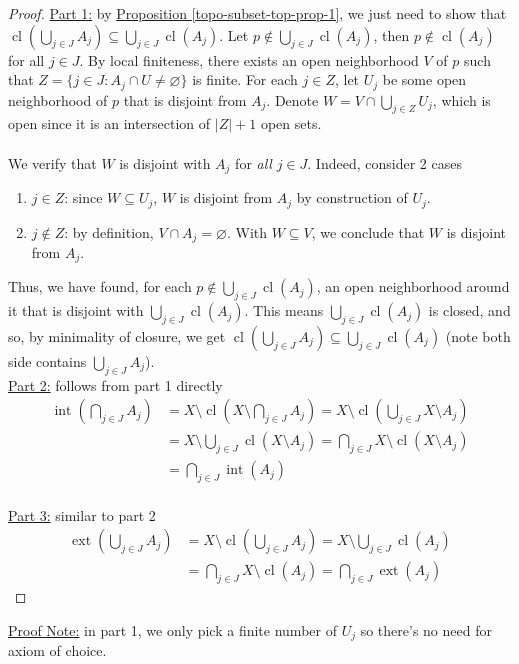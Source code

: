 \documentclass{treatise}
\begin{document}
\begin{proof}
\underline{Part 1:} by \hyperref[topo-subset-top-prop-1]{Proposition \ref*{topo-subset-top-prop-1}}, we just need to show that $\operatorname{cl} \left( \bigcup_{j \in J} A_j \right) \subseteq \bigcup_{j \in J} \operatorname{cl}(A_j)$. Let $p \notin \bigcup_{j \in J} \operatorname{cl}(A_j)$, then $p \notin \operatorname{cl}(A_j)$ for all $j \in J$. By local finiteness, there exists an open neighborhood $V$ of $p$ such that $Z = \{ j \in J : A_j \cap U \neq \varnothing \}$ is finite. For each $j \in Z$, let $U_j$ be some open neighborhood of $p$ that is disjoint from $A_j$. Denote $W = V \cap \bigcup_{j \in Z} U_j$, which is open since it is an intersection of $|Z|+1$ open sets.
\\
\\
We verify that $W$ is disjoint with $A_j$ for \textit{all} $j \in J$. Indeed, consider 2 cases
\begin{enumerate}
    \item $j \in Z$: since $W \subseteq U_j$, $W$ is disjoint from $A_j$ by construction of $U_j$.
    \item $j \notin Z$: by definition, $V \cap A_j = \varnothing$. With $W \subseteq V$, we conclude that $W$ is disjoint from $A_j$.
\end{enumerate}
Thus, we have found, for each $p \notin \bigcup_{j \in J} \operatorname{cl}(A_j)$, an open neighborhood around it that is disjoint with $\bigcup_{j \in J} \operatorname{cl}(A_j)$. This means $\bigcup_{j \in J} \operatorname{cl}(A_j)$ is closed, and so, by minimality of closure, we get $\operatorname{cl} \left( \bigcup_{j \in J} A_j \right) \subseteq \bigcup_{j \in J} \operatorname{cl}(A_j)$ (note both side contains $\bigcup_{j \in J} A_j$).
\\
\underline{Part 2:} follows from part 1 directly
\begin{align*}
    \operatorname{int} \left( \bigcap_{j \in J} A_j \right) & = X \setminus \operatorname{cl} \left( X \setminus \bigcap_{j \in J} A_j \right) = X \setminus \operatorname{cl} \left( \bigcup_{j \in J} X \setminus A_j \right)
    \\
    & = X \setminus \bigcup_{j \in J} \operatorname{cl} (X \setminus A_j) = \bigcap_{j \in J} X \setminus \operatorname{cl} (X \setminus A_j)
    \\
    & = \bigcap_{j \in J} \operatorname{int}(A_j)
\end{align*}
\\
\underline{Part 3:} similar to part 2
\begin{align*}
    \operatorname{ext} \left( \bigcup_{j \in J} A_j \right) & = X \setminus \operatorname{cl}\left( \bigcup_{j \in J} A_j \right) = X \setminus \bigcup_{j \in J} \operatorname{cl}(A_j)
    \\
    & = \bigcap_{j \in J} X \setminus \operatorname{cl}(A_j) = \bigcap_{j \in J} \operatorname{ext}(A_j)
\end{align*}
\end{proof}
\underline{Proof Note:} in part 1, we only pick a finite number of $U_j$ so there's no need for axiom of choice.
\end{document}
